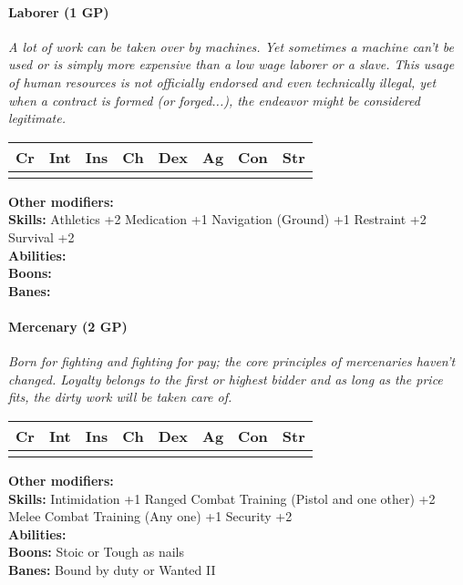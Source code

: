 \documentclass[12pt,a4paper,openany]{book}
\begin{document}
	\paragraph*{Laborer (1 GP)}
	\textit{A lot of work can be taken over by machines. Yet sometimes a machine can't be used or is simply more expensive than a low wage laborer or a slave. This usage of human resources is not officially endorsed and even technically illegal, yet when a contract is formed (or forged...), the endeavor might be considered legitimate.}\par
	\begin{tabular}{|l|l|l|l|l|l|l|l|}
		\hline
		Cr & Int & Ins & Ch & Dex & Ag & Con & Str \\ \hline
		&  &  &  &  &  &  &  \\ \hline
	\end{tabular}\par
	\noindent\textbf{Other modifiers:} \\
	\textbf{Skills:} Athletics +2
	Medication +1
	Navigation (Ground) +1
	Restraint +2
	Survival +2\\
	\textbf{Abilities:} \\
	\textbf{Boons:} \\
	\textbf{Banes:} \\
	
	\hrulefill
	\paragraph*{Mercenary (2 GP)}
	\textit{Born for fighting and fighting for pay; the core principles of mercenaries haven't changed. Loyalty belongs to the first or highest bidder and as long as the price fits, the dirty work will be taken care of.}\par
	\begin{tabular}{|l|l|l|l|l|l|l|l|}
		\hline
		Cr & Int & Ins & Ch & Dex & Ag & Con & Str \\ \hline
		&  &  &  &  &  &  &  \\ \hline
	\end{tabular}\par
	\noindent\textbf{Other modifiers:} \\
	\textbf{Skills:} Intimidation +1
	Ranged Combat Training (Pistol and one other) +2
	Melee Combat Training (Any one) +1
	Security +2\\
	\textbf{Abilities:} \\
	\textbf{Boons:} Stoic or Tough as nails\\
	\textbf{Banes:} Bound by duty or Wanted II\\
	
\end{document}
